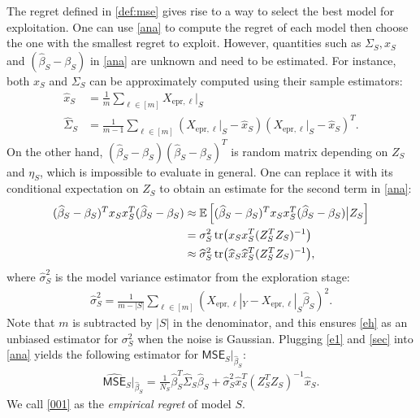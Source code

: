 \documentclass[a4paper,11pt]{article}
\numberwithin{equation}{section}
\theoremstyle{plain}
\theoremstyle{definition}
\def\E{{\mathbb E}}
\def\ex{{\text{epr}}}
\def\mse{{\textsf{MSE}}}
\begin{document}
The regret defined in \eqref{def:mse} gives rise to a way to select the best model for exploitation. 
One can use \eqref{ana} to compute the regret of each model then choose the one with the smallest regret to exploit. 
However, quantities such as $\Sigma_S, x_S$ and $(\widehat{\beta}_S-\beta_S)$ in \eqref{ana} are unknown and need to be estimated.
For instance, both $x_S$ and $\Sigma_S$ can be approximately computed using their sample estimators:
\begin{align}
\widehat{x}_S &= \frac{1}{m}\sum_{\ell\in [m]}X_{\ex, \ell}|_S\nonumber\\
\widehat{\Sigma}_S &= \frac{1}{m-1}\sum_{\ell\in [m]}(X_{\ex, \ell}|_S-\widehat{x}_S)(X_{\ex, \ell}|_S-\widehat{x}_S)^T.\label{e1}
\end{align} 
On the other hand, $(\widehat{\beta}_S-\beta_S)(\widehat{\beta}_S-\beta_S)^T$ is random matrix depending on $Z_S$ and $\eta_S$, which is impossible to evaluate in general. 
One can replace it with its conditional expectation on $Z_S$ to obtain an estimate for the second term in \eqref{ana}:
\begin{align}
(\widehat{\beta}_S-\beta_S)^Tx_Sx_S^T(\widehat{\beta}_S-\beta_S)&\approx \E\left[(\widehat{\beta}_S-\beta_S)^Tx_Sx_S^T(\widehat{\beta}_S-\beta_S)\big | Z_S\right]\nonumber\\
& = \sigma_S^2\tr(x_Sx_S^T(Z_S^TZ_S)^{-1})\nonumber\\
& \approx \widehat{\sigma}_S^2\tr(\widehat{x}_S\widehat{x}_S^T(Z_S^TZ_S)^{-1}),\label{sec}
\end{align}
where $\widehat{\sigma}^2_S$ is the model variance estimator from the exploration stage:
\begin{align}
\widehat{\sigma}^2_S = \frac{1}{m-|S|}\sum_{\ell\in [m]}\left(X_{\ex,\ell}|_Y -X_{\ex,\ell}|_S\widehat{\beta}_S \right)^2. \label{eh}
\end{align}
Note that $m$ is subtracted by $|S|$ in the denominator, and this ensures \eqref{eh} as an unbiased estimator for $\sigma_S^2$ when the noise is Gaussian. Plugging \eqref{e1} and \eqref{sec} into \eqref{ana} yields the following estimator for $\mse_S|_{\widehat{\beta}_S}$:
\begin{align}
\widehat{\mse}_S|_{\widehat{\beta}_S} = \frac{1}{N_S}\widehat{\beta}_S^T\widehat{\Sigma}_S\widehat{\beta}_S + \widehat{\sigma}_S^2\widehat{x}_S^T(Z_S^TZ_S)^{-1}\widehat{x}_S.\label{001}
\end{align}
We call \eqref{001} as the \emph{empirical regret} of model $S$. 
\end{document}
